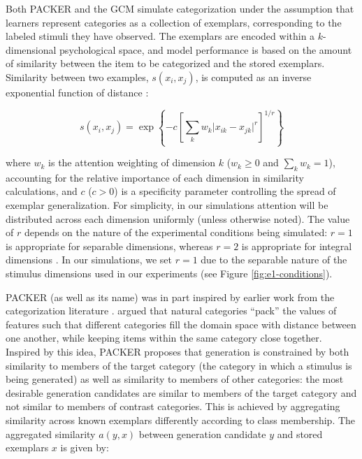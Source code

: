 \documentclass[pdflatex,sn-apa]{sn-jnl}%
\theoremstyle{thmstyleone}%
\theoremstyle{thmstyletwo}%
\theoremstyle{thmstylethree}%
\begin{document}
Both PACKER and the GCM simulate categorization under the assumption that
learners represent categories as a collection of exemplars, corresponding to the
labeled stimuli they have observed. The exemplars are encoded within a
$k$-dimensional psychological space, and model performance is based on the
amount of similarity between the item to be categorized and the stored
exemplars. Similarity between two examples, $s\left(x_i, x_j\right)$, is
computed as an inverse exponential function of distance
\citep[following][]{attneave1950,shepard1957stimulus,shepard1987toward}:

\begin{equation}
s \left(x_i,x_j \right) = \exp \left\{ -c \left[ \sum_{k}{w_k \lvert x_{ik}-x_{jk} \rvert ^r }  \right]^{1/r}  \right\}
\label{eq:similarity}
\end{equation}

% 
\noindent where $w_k$ is the attention weighting of dimension $k$ ($w_k \geq 0$ and
$\sum_k{w_k} = 1$), accounting for the relative importance of each dimension in
similarity calculations, and $c$ ($c>0$) is a specificity parameter controlling
the spread of exemplar generalization. For simplicity, in our simulations
attention will be distributed across each dimension uniformly (unless otherwise
noted). The value of $r$ depends on the nature of the experimental conditions
being simulated: $r=1$ is appropriate for separable dimensions, whereas $r=2$ is
appropriate for integral dimensions
\citep[e.g.,][]{shepard1964attention,garner1974processing}. In our simulations,
we set $r=1$ due to the separable nature of the stimulus dimensions used in our
experiments (see Figure \ref{fig:e1-conditions}).

PACKER (as well as its name) was in part inspired by earlier work from the
categorization literature \citep{hidaka2011packing,stewart2005}. \citet{hidaka2011packing} argued that
natural categories ``pack'' the values of features such that different
categories fill the domain space with distance between one another, while
keeping items within the same category close together. Inspired by this idea,
PACKER proposes that generation is constrained by both similarity to members of
the target category (the category in which a stimulus is being generated) as
well as similarity to members of other categories: the most desirable generation
candidates are similar to members of the target category and not similar to
members of contrast categories. This is achieved by aggregating similarity
across known exemplars differently according to class membership. The aggregated
similarity $a(y,x)$ between generation candidate $y$ and stored exemplars $x$ is
given by:
\end{document}
